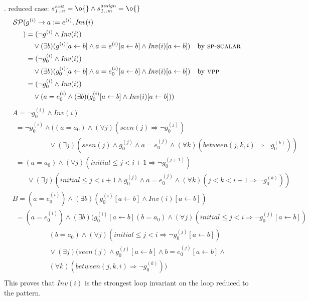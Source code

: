 \documentclass[a4paper,10pt]{article}
\newcommand{\idx}{\ensuremath{i}\xspace}
\newcommand{\idxinitial}{\ensuremath{\mathit{initial}}\xspace}
\newcommand{\at}[1]{{(#1)}}
\newcommand{\impl}{\ensuremath{\Longrightarrow}}
\newcommand{\seen}[1]{\ensuremath{\mathit{seen}(#1)}\xspace}
\newcommand{\between}[3]{\ensuremath{\mathit{between}{(#1,#2,#3)}}\xspace}
\newcommand{\Inv}[1]{\ensuremath{\mathit{Inv}(#1)\xspace}}
\newcommand{\gstatement}[2]{\ensuremath{s^{\mathit{#1}}_{\mathit{#2}}\xspace}}
\newcommand{\vpp}{\textsc{vpp}\xspace}
\newcommand{\spscalar}{\textsc{sp-scalar}\xspace}
\newenvironment{proof}[1][Proof.]{\begin{trivlist}
\item[\hskip \labelsep {\bfseries #1}]}{\end{trivlist}}
\begin{document}
\begin{proof}
. reduced case: $\gstatement{exit}{1..n} = \o{} \land \gstatement{assign}{1..m} = \o{}$
  \begin{align*}
    \spost{
    & g^\at{\idx} \rightarrow a := e^\at{\idx}}{\Inv{\idx}\\
    }
    &= (\neg g^\at{\idx} \land \Inv{\idx}) \\
    & \quad \lor (\exists b) (g^\at{\idx}[a\leftarrow b] \land 
       a = e^\at{\idx}[a\leftarrow b] \land \Inv{\idx}[a\leftarrow b])   && \text{by \spscalar}\\
    &= (\neg g_0^\at{\idx} \land \Inv{\idx}) \\
    & \quad \lor (\exists b) (g_0^\at{\idx}[a\leftarrow b] \land 
       a = e_0^\at{\idx}[a\leftarrow b] \land \Inv{\idx}[a\leftarrow b])   && \text{by \vpp}\\
    &= (\neg g_0^\at{\idx} \land \Inv{\idx}) \\
    & \quad \lor ( a = e_0^\at{\idx} \land  (\exists b) (g_0^\at{\idx}[a\leftarrow b] \land 
        \Inv{\idx}[a\leftarrow b]))   &&\\
  \end{align*}
  \begin{align*}
    &A= \neg g_0^\at{\idx} \land \Inv{\idx} \\
    &~~= \neg g_0^\at{\idx} \land ((a = a_0) \land (\forall j)(\seen{j} \impl \neg g_0^\at{j})\\
    &\phantom{A= g_0^\at{\idx} \land}
       \lor (\exists j)(\seen{j} \land g_0^\at{j} \land a = e_0^\at{j} \land (\forall k)(\between{j}{k}{\idx} \impl \neg g_0^\at{k}))\\
    &~~= (a = a_0) \land (\forall j)(\idxinitial \leq j < \idx+1 \impl \neg g_0^\at{j+1})\\
    &\phantom{A=}
       \lor (\exists j)(\idxinitial \leq j < \idx+1 \land g_0^\at{j} \land a = e_0^\at{j} \land (\forall k)(j < k < \idx+1 \impl \neg g_0^\at{k}))
  \end{align*}
  \begin{align*}
    &B=(a = e_0^\at{\idx}) \land  (\exists b) (g_0^\at{\idx}[a\leftarrow b] \land \Inv{\idx}[a\leftarrow b])\\
    &~~=(a = e_0^\at{\idx}) \land  (\exists b) (g_0^\at{\idx}[a\leftarrow b] (b = a_0) \land (\forall j)(\idxinitial \leq j < \idx \impl \neg g_0^\at{j}[a\leftarrow b])\\ 
    &\phantom{A= g_0^\at{\idx} \land} 
      (b = a_0) \land (\forall j)(\idxinitial \leq j < \idx \impl \neg g_0^\at{j}[a\leftarrow b])\\
    &\phantom{A= g_0^\at{\idx} \land}
       \lor (\exists j)(\seen{j} \land g_0^\at{j}[a\leftarrow b] \land b = e_0^\at{j}[a\leftarrow b] \land \\
    &\phantom{A= g_0^\at{\idx} \land}
       (\forall k)(\between{j}{k}{\idx} \impl \neg g_0^\at{k}))\\
  \end{align*}
  This proves that \Inv{\idx} is the strongest loop invariant on the 
  loop reduced to the pattern. 


\end{proof}
\end{document}
